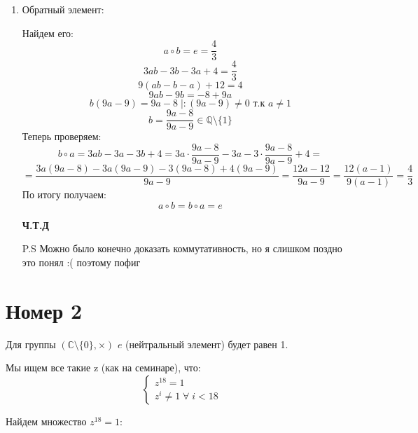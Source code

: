 \documentclass[a4paper,12pt]{article}
\begin{document}
\begin{itemize}
\begin{enumerate}
\item Обратный элемент:

\quad Найдем его:
\[
a \circ b = e = \frac{4}{3}
\]
\[
3ab - 3b - 3a + 4 = \frac{4}{3}
\]
\[
9(ab - b - a) + 12 = 4
\]
\[
9ab - 9b  = -8 + 9a
\]
\[
b(9a - 9) = 9a - 8 \; \bigg| : (9a - 9) \neq 0 \text{ т.к $a \neq 1$}
\]
\[
b = \frac{9a-8}{9a - 9} \in \mathbb{Q} \setminus \{1\}
\]
\quad Теперь проверяем:
\[
b \circ a = 3ab - 3a - 3b + 4 = 3a \cdot \frac{9a-8}{9a - 9} - 3a - 3 \cdot \frac{9a-8}{9a - 9} + 4 = 
\]
\[
=
\frac{3a(9a - 8) - 3a(9a-9) - 3(9a-8) + 4(9a-9)}{9a-9} = \frac{12a-12}{9a-9} = \frac{12(a - 1)}{9(a - 1)} = \frac{4}{3}
\]
\quad По итогу получаем:
\[
a \circ b = b \circ a  = e
\]
{\large \begin{center}
\textbf{Ч.Т.Д} 
\end{center}}
P.S Можно было конечно доказать коммутативность, но я слишком поздно это понял :( поэтому пофиг
\end{enumerate}
 \end{itemize}

\clearpage
\section*{Номер 2}
Для группы $\left( \mathbb{C} \setminus \{0\}, \times \right) $ $e$ (нейтральный элемент) будет равен 1.


Мы ищем все такие z (как на семинаре), что:
\[
\begin{cases}
z^{18} = 1 \\
z^{i} \neq 1 \; \forall \; i < 18
\end{cases}
\]

Найдем множество $z^{18} =1 $:
\end{document}
